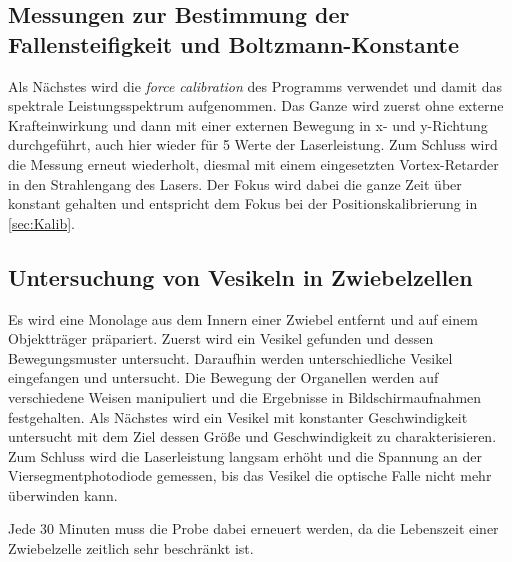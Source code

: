   \subsection{Messungen zur Bestimmung der Fallensteifigkeit und Boltzmann-Konstante}
    Als Nächstes wird die \textit{force calibration} des Programms verwendet und damit das spektrale Leistungsspektrum aufgenommen. Das Ganze wird zuerst ohne externe Krafteinwirkung und dann mit einer externen Bewegung in x- und y-Richtung durchgeführt, auch hier wieder für 5 Werte der Laserleistung. Zum Schluss wird die Messung erneut wiederholt, diesmal mit einem eingesetzten Vortex-Retarder in den Strahlengang des Lasers.
    Der Fokus wird dabei die ganze Zeit über konstant gehalten und entspricht dem Fokus bei der Positionskalibrierung in \ref{sec:Kalib}.
  \subsection{Untersuchung von Vesikeln in Zwiebelzellen}
    Es wird eine Monolage aus dem Innern einer Zwiebel entfernt und auf einem Objektträger präpariert.
    Zuerst wird ein Vesikel gefunden und dessen Bewegungsmuster untersucht. Daraufhin werden unterschiedliche Vesikel eingefangen und untersucht. Die Bewegung der Organellen werden auf verschiedene Weisen manipuliert und die Ergebnisse in Bildschirmaufnahmen festgehalten.
    Als Nächstes wird ein Vesikel mit konstanter Geschwindigkeit untersucht mit dem Ziel dessen Größe und Geschwindigkeit zu charakterisieren.
    Zum Schluss wird die Laserleistung langsam erhöht und die Spannung an der Viersegmentphotodiode gemessen, bis das Vesikel die optische Falle nicht mehr überwinden kann.
    
    Jede 30 Minuten muss die Probe dabei erneuert werden, da die Lebenszeit einer Zwiebelzelle zeitlich sehr beschränkt ist.